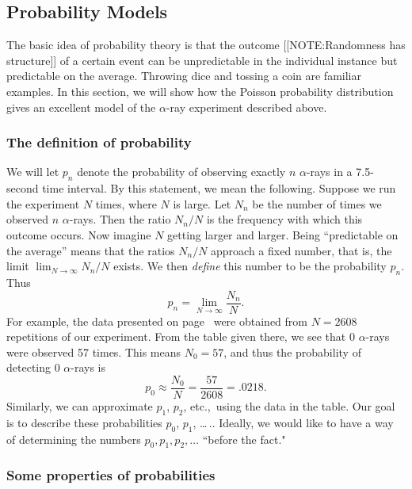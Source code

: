 \subsection{Probability Models}
\label{subsec:probability-models}


The basic idea of probability theory is that the outcome
[[NOTE:Randomness has structure]] 
of a certain event can be unpredictable in the individual instance but
predictable on the average.  Throwing dice and tossing a coin are
familiar examples.  In this section, we will show how the Poisson
probability distribution gives an excellent model of the $\alpha$-ray
experiment described above.

\subsubsection{The definition of probability}
\label{subsubsec:the-definition-of-probability}

We will let $p_n$ denote the probability of observing exactly $n$
$\alpha$-rays in a 7.5-second time interval.  By this statement, we
mean the following.  Suppose we run the experiment $N$ times, where
$N$ is large.  Let $N_n$ be the number of times we observed $n$
$\alpha$-rays.  Then the ratio $N_n/N$ is the frequency with which
this outcome occurs.  Now imagine $N$ getting larger and larger. Being
``predictable on the average'' means that the ratios $N_n/N$ approach
a fixed number, that is, the limit $\lim_{N\to\infty}N_n/N$ exists.
We then {\em define\/} this number to be the probability $p_n$.  Thus
\[ 
p_n = \lim_{N\to\infty}\dfrac{N_n}{N}.
\]
For example, the data presented on page~\pageref{data} were obtained
from $N = 2608$ repetitions of our experiment.  From the table given
there, we see that 0 $\alpha$-rays were observed 57 times.  This means
$N_0 = 57$, and thus the probability of detecting 0 $\alpha$-rays is
\[ 
p_0 \approx \dfrac{N_0}{N} = \dfrac{57}{2608} = .0218.
\]
Similarly, we can approximate $p_1$, $p_2$, etc.,~using the data in
the table.  Our goal is to describe these probabilities $p_0$, $p_1$,
\ldots \,..  Ideally, we would like to have a way of determining the
numbers $p_0, p_1, p_2, \ldots$ ``before the fact."

\subsubsection{Some properties of probabilities}
\label{subsubsec:some-properties-of-probabilities}

